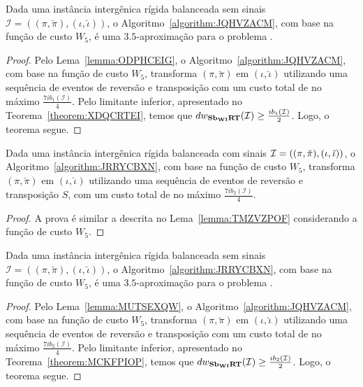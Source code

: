 \begin{theorem}\label{theorem:SEJEYSUH}
Dada uma instância intergênica rígida balanceada sem sinais $\mathcal{I}=((\pi,\breve\pi),(\iota,\breve\iota))$, o Algoritmo~\ref{algorithm:JQHVZACM}, com base na função de custo $W_5$, é uma $3.5$-aproximação para o problema \SbWIRT{}.
\end{theorem}
\begin{proof}
Pelo Lema~\ref{lemma:ODPHCEIG}, o Algoritmo~\ref{algorithm:JQHVZACM}, com base na função de custo $W_5$, transforma $(\pi,\breve\pi)$ em $(\iota,\breve\iota)$ utilizando uma sequência de eventos de reversão e transposição com um custo total de no máximo $\frac{7ib_1(\mathcal{I})}{4}$. Pelo limitante inferior, apresentado no Teorema~\ref{theorem:XDQCRTEI}, temos que $dw_{\textbf{Sb\textsubscript{WI}RT}}(\mathcal{I}) \ge \frac{ib_1(\mathcal{I})}{2}$. Logo, o teorema segue.
\end{proof}

\begin{lemma}\label{lemma:MUTSEXQW}
Dada uma instância intergênica rígida balanceada com sinais $\mathcal{I}=((\pi,\breve\pi),\break(\iota,\breve\iota))$, o Algoritmo~\ref{algorithm:JRRYCBXN}, com base na função de custo $W_5$, transforma $(\pi,\breve\pi)$ em $(\iota,\breve\iota)$ utilizando uma sequência de eventos de reversão e transposição $S$, com um custo total de no máximo $\frac{7ib_2(\mathcal{I})}{4}$.
\end{lemma}
\begin{proof}
A prova é similar a descrita no Lema~\ref{lemma:TMZVZPOF} considerando a função de custo $W_5$.
\end{proof}

\begin{theorem}\label{theorem:ZYFESTTM}
Dada uma instância intergênica rígida balanceada sem sinais $\mathcal{I}=((\pi,\breve\pi),(\iota,\breve\iota))$, o Algoritmo~\ref{algorithm:JRRYCBXN}, com base na função de custo $W_5$, é uma $3.5$-aproximação para o problema \SbWIRT{}.
\end{theorem}
\begin{proof}
Pelo Lema~\ref{lemma:MUTSEXQW}, o Algoritmo~\ref{algorithm:JQHVZACM}, com base na função de custo $W_5$, transforma $(\pi,\breve\pi)$ em $(\iota,\breve\iota)$ utilizando uma sequência de eventos de reversão e transposição com um custo total de no máximo $\frac{7ib_2(\mathcal{I})}{4}$. Pelo limitante inferior, apresentado no Teorema~\ref{theorem:MCKFPIOP}, temos que $dw_{\textbf{Sb\textsubscript{WI}RT}}(\mathcal{I}) \ge \frac{ib_2(\mathcal{I})}{2}$. Logo, o teorema segue.
\end{proof}


